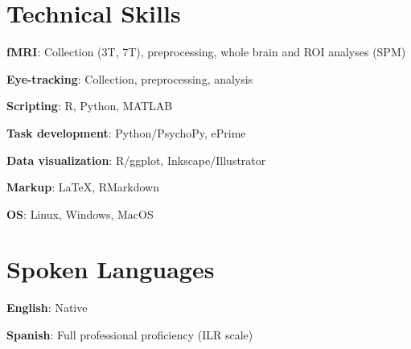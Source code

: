 \documentclass{article}
\newcommand{\entry}[5]{

  \begin{minipage}[t]{.15\textwidth}
    \begin{flushright}
      \hfill {#1}
    \end{flushright}
  \end{minipage}
  \hfill\vline\hfill
  \begin{minipage}[t]{.80\textwidth}
    \textbf{#2}

    \ifx&#3&
      {#3}\textit{#4}
    \else
      {#3, }\textit{#4}

    \fi
    \footnotesize{#5}
  \end{minipage}\\\vspace{.25cm}
}
\newcommand{\skillentry}[2]{
  {\hspace{2em}\textbf{#1}:}
  {#2}
  \vspace{.25cm}
}
\newcommand{\sjc}{St. John's College}
\begin{document}
%
%
%
%

\section{Technical Skills}

\skillentry{fMRI}
{Collection (3T, 7T), preprocessing, whole brain and ROI analyses (SPM)}

\skillentry{Eye-tracking}{Collection, preprocessing, analysis}

\skillentry{Scripting}{R, Python, MATLAB}

\skillentry{Task development}
{Python/PsychoPy, ePrime}

\skillentry{Data visualization}{R/ggplot, Inkscape/Illustrator}

\skillentry{Markup}{\LaTeX, RMarkdown}

\skillentry{OS}{Linux, Windows, MacOS}

\section{Spoken Languages}
\skillentry{English}{Native}

\skillentry{Spanish}{Full professional proficiency (ILR scale)}
\end{document}
